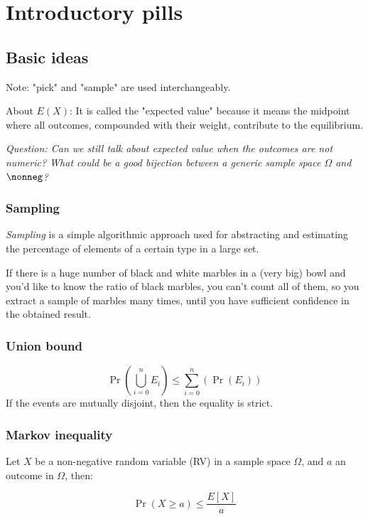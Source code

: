 \chapter{Introductory pills}

\section{Basic ideas}

	Note: "pick" and "sample" are used interchangeably.

	About $E(X)$: It is called the "expected value" because it means the midpoint where all outcomes, compounded with their weight, contribute to the equilibrium.
	
	\textit{Question: Can we still talk about expected value when the outcomes are not numeric? What could be a good bijection between a generic sample space $\Omega$ and $\nonneg$?}
	
\subsection{Sampling}

	\textit{Sampling} is a simple algorithmic approach used for abstracting and estimating the percentage of elements of a certain type in a large set.
	
	\ex If there is a huge number of black and white marbles in a (very big) bowl and you'd like to know the ratio of black marbles, you can't count all of them, so you extract a sample of marbles many times, until you have sufficient confidence in the obtained result.


\subsection{Union bound}
	
	\begin{equation}
	\Pr(\bigcup_{i=0}^n E_i) \leq \sum_{i=0}^{n}(\Pr(E_i))
	\end{equation}
	If the events are mutually disjoint, then the equality is strict.

	
\subsection{Markov inequality}
	
	Let $X$ be a non-negative random variable (RV) in a sample space $\Omega$, and $a$ an outcome in $\Omega$, then:
	
	\begin{equation}
	\Pr(X \geq a) \leq \frac{E[X]}{a}
	\end{equation}
	
